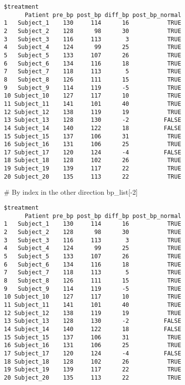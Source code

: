 \documentclass[
  letterpaper,
  DIV=11,
  numbers=noendperiod]{scrartcl}
\newenvironment{Shaded}{\begin{snugshade}}{\end{snugshade}}
\newcommand{\CommentTok}[1]{\textcolor[rgb]{0.37,0.37,0.37}{#1}}
\newcommand{\DecValTok}[1]{\textcolor[rgb]{0.68,0.00,0.00}{#1}}
\newcommand{\NormalTok}[1]{\textcolor[rgb]{0.00,0.23,0.31}{#1}}
\newcommand{\SpecialCharTok}[1]{\textcolor[rgb]{0.37,0.37,0.37}{#1}}
\begin{document}
\begin{verbatim}
$treatment
      Patient pre_bp post_bp diff_bp post_bp_normal
1   Subject_1    130     114      16           TRUE
2   Subject_2    128      98      30           TRUE
3   Subject_3    116     113       3           TRUE
4   Subject_4    124      99      25           TRUE
5   Subject_5    133     107      26           TRUE
6   Subject_6    134     116      18           TRUE
7   Subject_7    118     113       5           TRUE
8   Subject_8    126     111      15           TRUE
9   Subject_9    114     119      -5           TRUE
10 Subject_10    127     117      10           TRUE
11 Subject_11    141     101      40           TRUE
12 Subject_12    138     119      19           TRUE
13 Subject_13    128     130      -2          FALSE
14 Subject_14    140     122      18          FALSE
15 Subject_15    137     106      31           TRUE
16 Subject_16    131     106      25           TRUE
17 Subject_17    120     124      -4          FALSE
18 Subject_18    128     102      26           TRUE
19 Subject_19    139     117      22           TRUE
20 Subject_20    135     113      22           TRUE
\end{verbatim}

\begin{Shaded}
\begin{Highlighting}[]
\CommentTok{\# By index in the other direction}
\NormalTok{bp\_list[}\SpecialCharTok{{-}}\DecValTok{2}\NormalTok{]}
\end{Highlighting}
\end{Shaded}

\begin{verbatim}
$treatment
      Patient pre_bp post_bp diff_bp post_bp_normal
1   Subject_1    130     114      16           TRUE
2   Subject_2    128      98      30           TRUE
3   Subject_3    116     113       3           TRUE
4   Subject_4    124      99      25           TRUE
5   Subject_5    133     107      26           TRUE
6   Subject_6    134     116      18           TRUE
7   Subject_7    118     113       5           TRUE
8   Subject_8    126     111      15           TRUE
9   Subject_9    114     119      -5           TRUE
10 Subject_10    127     117      10           TRUE
11 Subject_11    141     101      40           TRUE
12 Subject_12    138     119      19           TRUE
13 Subject_13    128     130      -2          FALSE
14 Subject_14    140     122      18          FALSE
15 Subject_15    137     106      31           TRUE
16 Subject_16    131     106      25           TRUE
17 Subject_17    120     124      -4          FALSE
18 Subject_18    128     102      26           TRUE
19 Subject_19    139     117      22           TRUE
20 Subject_20    135     113      22           TRUE
\end{verbatim}
\end{document}
